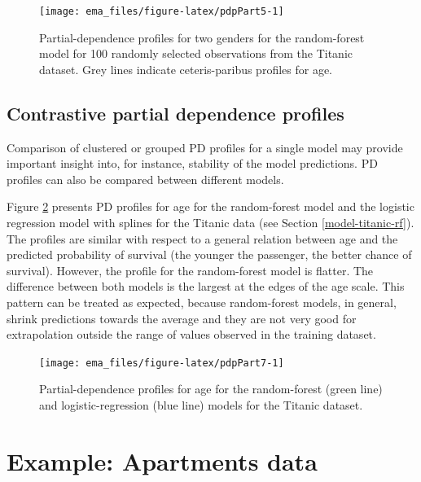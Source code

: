 \documentclass[]{krantz}
\begin{document}
\begin{figure}

{\centering \texttt{[image: ema\_files/figure-latex/pdpPart5-1]} 

}

\caption{Partial-dependence profiles for two genders for the random-forest model for 100 randomly selected observations from the Titanic dataset. Grey lines indicate ceteris-paribus profiles for age.}\label{fig:pdpPart5}
\end{figure}

\hypertarget{contrastivePDPs}{%
\subsection{Contrastive partial dependence profiles}\label{contrastivePDPs}}

Comparison of clustered or grouped PD profiles for a single model may provide important insight into, for instance, stability of the model predictions. PD profiles can also be compared between different models.

Figure \ref{fig:pdpPart7} presents PD profiles for age for the random-forest model and the logistic regression model with splines for the Titanic data (see Section \ref{model-titanic-rf}). The profiles are similar with respect to a general relation between age and the predicted probability of survival (the younger the passenger, the better chance of survival). However, the profile for the random-forest model is flatter. The difference between both models is the largest at the edges of the age scale. This pattern can be treated as expected, because random-forest models, in general, shrink predictions towards the average and they are not very good for extrapolation outside the range of values observed in the training dataset.

\begin{figure}

{\centering \texttt{[image: ema\_files/figure-latex/pdpPart7-1]} 

}

\caption{Partial-dependence profiles for age for the random-forest (green line) and logistic-regression (blue line) models for the Titanic dataset.}\label{fig:pdpPart7}
\end{figure}

\hypertarget{PDPExample}{%
\section{Example: Apartments data}\label{PDPExample}}
\end{document}
